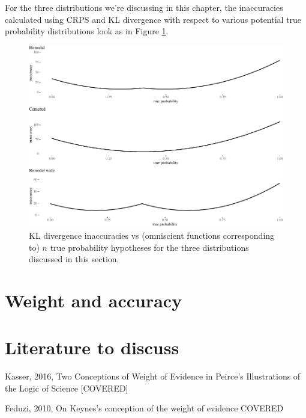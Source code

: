 \documentclass[
  10pt,
  dvipsnames,enabledeprecatedfontcommands]{scrartcl}
\begin{document}
For the three distributions we're discussing in this chapter, the
inaccuracies calculated using CRPS and KL divergence with respect to
various potential true probability distributions look as in Figure
\ref{fig:inaccuracies2}.

\begin{figure}[H]

\begin{center}\includegraphics[width=1\linewidth]{imprecision_weight_files/figure-latex/fig:inaccuracies2-1} \end{center}
\caption{KL divergence inaccuracies vs (omniscient functions corresponding to) $n$ true probability hypotheses for the three distributions discussed in this section.}
\label{fig:inaccuracies2}
\end{figure}

\hypertarget{weight-and-accuracy}{%
\section{Weight and accuracy}\label{weight-and-accuracy}}

\hypertarget{literature-to-discuss}{%
\section{Literature to discuss}\label{literature-to-discuss}}

Kasser, 2016, Two Conceptions of Weight of Evidence in Peirce's
Illustrations of the Logic of Science {[}COVERED{]}

Feduzi, 2010, On Keynes's conception of the weight of evidence COVERED
\end{document}
